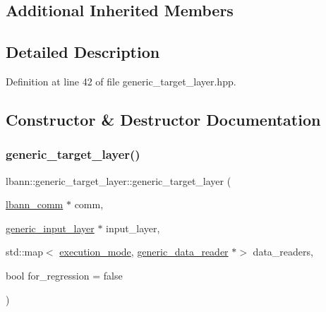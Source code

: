 \subsection*{Additional Inherited Members}


\subsection{Detailed Description}


Definition at line 42 of file generic\+\_\+target\+\_\+layer.\+hpp.



\subsection{Constructor \& Destructor Documentation}
\mbox{\label{classlbann_1_1generic__target__layer_a9b82afdbd6bb2671b0fde30c0116ada5}} 
\subsubsection{\texorpdfstring{generic\+\_\+target\+\_\+layer()}{generic\_target\_layer()}\hspace{0.1cm}{\footnotesize\ttfamily [1/2]}}
{\footnotesize\ttfamily lbann\+::generic\+\_\+target\+\_\+layer\+::generic\+\_\+target\+\_\+layer (\begin{DoxyParamCaption}\item[{\hyperlink{classlbann_1_1lbann__comm}{lbann\+\_\+comm} $\ast$}]{comm,  }\item[{\hyperlink{classlbann_1_1generic__input__layer}{generic\+\_\+input\+\_\+layer} $\ast$}]{input\+\_\+layer,  }\item[{std\+::map$<$ \hyperlink{base_8hpp_a2781a159088df64ed7d47cc91c4dc0a8}{execution\+\_\+mode}, \hyperlink{classlbann_1_1generic__data__reader}{generic\+\_\+data\+\_\+reader} $\ast$$>$}]{data\+\_\+readers,  }\item[{bool}]{for\+\_\+regression = {\ttfamily false} }\end{DoxyParamCaption})\hspace{0.3cm}{\ttfamily [inline]}}



